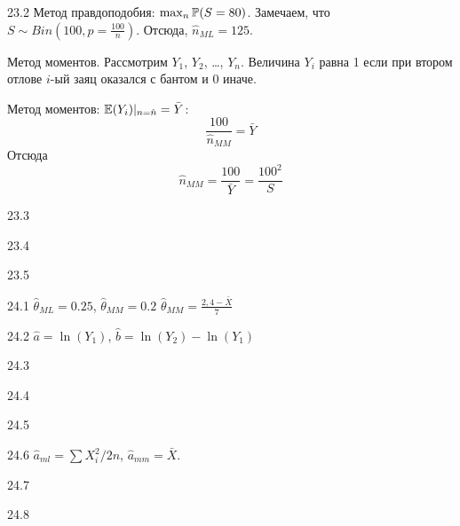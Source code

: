 \protect \hypertarget {soln:23.2}{}
\begin{solution}{{23.2}}
Метод правдоподобия: $\max_n \P(S=80)$. Замечаем, что $S \sim Bin\left(100, p=\frac{100}{n}\right)$. Отсюда, $\hat n_{ML} = 125$.

Метод моментов. Рассмотрим $Y_1$, $Y_2$, \ldots, $Y_n$. Величина $Y_i$ равна 1 если при втором отлове $i$-ый заяц оказался с бантом и 0 иначе.

Метод моментов: $\E(Y_i)|_{n=\hat n}=\bar Y$:
\[
\frac{100}{\hat n_{MM}}=\bar Y
\]
Отсюда
\[
\hat n_{MM} = \frac{100}{\bar Y} = \frac{100^2}{S}
\]
\end{solution}
\protect \hypertarget {soln:23.3}{}
\begin{solution}{{23.3}}
\end{solution}
\protect \hypertarget {soln:23.4}{}
\begin{solution}{{23.4}}
\end{solution}
\protect \hypertarget {soln:23.5}{}
\begin{solution}{{23.5}}
\end{solution}
\protect \hypertarget {soln:24.1}{}
\begin{solution}{{24.1}}
  $\hat{\theta}_{ML}=0.25$, $\hat{\theta}_{MM}=0.2$
  $\hat{\theta}_{MM}=\frac{2{,}4-\bar{X}}{7}$
\end{solution}
\protect \hypertarget {soln:24.2}{}
\begin{solution}{{24.2}}
$\hat{a}=\ln(Y_{1})$, $\hat{b}=\ln(Y_{2})-\ln(Y_{1})$
\end{solution}
\protect \hypertarget {soln:24.3}{}
\begin{solution}{{24.3}}
\end{solution}
\protect \hypertarget {soln:24.4}{}
\begin{solution}{{24.4}}
\end{solution}
\protect \hypertarget {soln:24.5}{}
\begin{solution}{{24.5}}
\end{solution}
\protect \hypertarget {soln:24.6}{}
\begin{solution}{{24.6}}
$\hat{a}_{ml}=\sum X_i^2/2n$, $\hat{a}_{mm}=\bar{X}$.
\end{solution}
\protect \hypertarget {soln:24.7}{}
\begin{solution}{{24.7}}
\end{solution}
\protect \hypertarget {soln:24.8}{}
\begin{solution}{{24.8}}
\end{solution}
\protect \hypertarget {soln:24.9}{}
